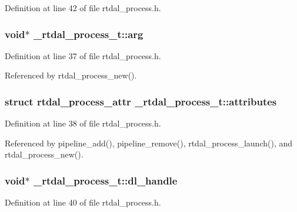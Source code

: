 Definition at line 42 of file rtdal\-\_\-process.\-h.

\hypertarget{struct__rtdal__process__t_a599955d623bc30d0dbf8aca3189b1696}{
\subsubsection[{arg}]{\setlength{\rightskip}{0pt plus 5cm}void$\ast$ \-\_\-rtdal\-\_\-process\-\_\-t\-::arg}}\label{struct__rtdal__process__t_a599955d623bc30d0dbf8aca3189b1696}


Definition at line 37 of file rtdal\-\_\-process.\-h.



Referenced by rtdal\-\_\-process\-\_\-new().

\hypertarget{struct__rtdal__process__t_ab9d4fcf66abec2cf4495a7b6574fea52}{
\subsubsection[{attributes}]{\setlength{\rightskip}{0pt plus 5cm}struct {\bf rtdal\-\_\-process\-\_\-attr} \-\_\-rtdal\-\_\-process\-\_\-t\-::attributes}}\label{struct__rtdal__process__t_ab9d4fcf66abec2cf4495a7b6574fea52}


Definition at line 38 of file rtdal\-\_\-process.\-h.



Referenced by pipeline\-\_\-add(), pipeline\-\_\-remove(), rtdal\-\_\-process\-\_\-launch(), and rtdal\-\_\-process\-\_\-new().

\hypertarget{struct__rtdal__process__t_aa5f45d6f44b73777366345845eb1bb99}{
\subsubsection[{dl\-\_\-handle}]{\setlength{\rightskip}{0pt plus 5cm}void$\ast$ \-\_\-rtdal\-\_\-process\-\_\-t\-::dl\-\_\-handle}}\label{struct__rtdal__process__t_aa5f45d6f44b73777366345845eb1bb99}


Definition at line 40 of file rtdal\-\_\-process.\-h.



